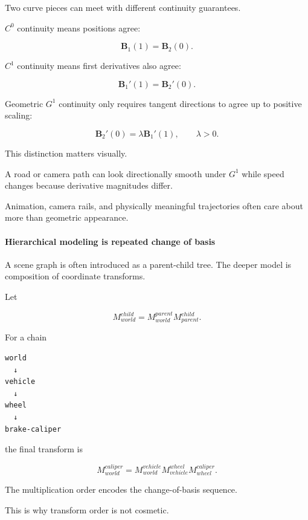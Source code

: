 \hypertarget{03-visual-computing-i-ch001-continuity-between-curve-segments-has-levels}{}

Two curve pieces can meet with different continuity guarantees.

\(C^0\) continuity means positions agree:

\[
\mathbf B_1(1)=\mathbf B_2(0).
\]

\(C^1\) continuity means first derivatives also agree:

\[
\mathbf B_1'(1)=\mathbf B_2'(0).
\]

Geometric \(G^1\) continuity only requires tangent directions to agree up to positive scaling:

\[
\mathbf B_2'(0)=\lambda\mathbf B_1'(1),
\qquad
\lambda>0.
\]

This distinction matters visually.

A road or camera path can look directionally smooth under \(G^1\) while speed changes because derivative magnitudes differ.

Animation, camera rails, and physically meaningful trajectories often care about more than geometric appearance.

\paragraph{Hierarchical modeling is repeated change of basis}\label{03-visual-computing-i-ch001-hierarchical-modeling-is-repeated-change-of-basis}

\hypertarget{03-visual-computing-i-ch001-hierarchical-modeling-is-repeated-change-of-basis}{}

A scene graph is often introduced as a parent-child tree. The deeper model is composition of coordinate transforms.

Let

\[
M_{world}^{child}
=
M_{world}^{parent}
M_{parent}^{child}.
\]

For a chain

\begin{verbatim}
world
  ↓
vehicle
  ↓
wheel
  ↓
brake-caliper
\end{verbatim}

the final transform is

\[
M_{world}^{caliper}
=
M_{world}^{vehicle}
M_{vehicle}^{wheel}
M_{wheel}^{caliper}.
\]

The multiplication order encodes the change-of-basis sequence.

This is why transform order is not cosmetic.

